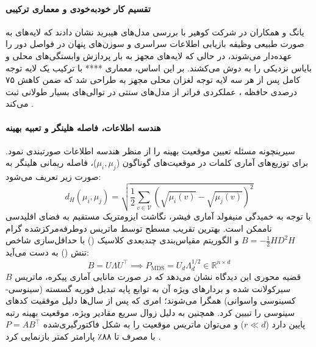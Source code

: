 \paragraph*{تقسیم کار خودبه‌خودی و معماری ترکیبی }
یانگ و همکاران در شرکت کوهیر \cite{yang2025rope} با بررسی مدل‌های هیبرید نشان دادند که لایه‌های  به صورت طبیعی وظیفه بازیابی اطلاعات سراسری و سوزن‌های پنهان در فواصل دور را عهده‌دار می‌شوند، در حالی که لایه‌های مجهز به  بار پردازش وابستگی‌های محلی و بایاس نزدیکی را به دوش می‌کشند. بر این اساس، معماری **** با ترکیب یک لایه توجه کامل  پس از هر سه لایه توجه لغزان محلی مجهز به  طراحی شد که ضمن کاهش ۷۵ درصدی حافظه ، عملکردی فراتر از مدل‌های سنتی در توالی‌های بسیار طولانی ثبت می‌کند \cite{yang2025rope}.

\paragraph*{هندسه اطلاعات، فاصله هلینگر و تعبیه بهینه }
سیرینچونه \cite{cirrincione2026geometry} مسئله تعیین موقعیت بهینه را از منظر هندسه اطلاعات صورتبندی نمود. برای توزیع‌های آماری کلمات در موقعیت‌های گوناگون ($\mu_i, \mu_j$)، فاصله ریمانی هلینگر به صورت زیر تعریف می‌شود:
\begin{equation}
    d_H(\mu_i, \mu_j) = \sqrt{\frac{1}{2} \sum_{v \in \mathcal{V}} \left( \sqrt{\mu_i(v)} - \sqrt{\mu_j(v)} \right)^2}
\end{equation}
با توجه به خمیدگی منیفولد آماری فیشر، نگاشت ایزومتریک مستقیم به فضای اقلیدسی ناممکن است. بهترین تقریب مسطح توسط ماتریس دوطرفه‌مرکزشده گرام $B = -\frac{1}{2} H D^2 H$ و الگوریتم مقیاس‌بندی چندبعدی کلاسیک () با حداقل‌سازی شاخص تنش () به دست می‌آید:
\begin{equation}
    B = U \Lambda U^\top \implies P_{\text{MDS}} = U_d \Lambda_d^{1/2} \in \mathbb{R}^{n \times d}
\end{equation}
قضیه محوری این دیدگاه نشان می‌دهد که در صورت مانایی آماری پیکره، ماتریس $B$ سیرکولانت شده و بردارهای ویژه آن به توابع پایه تبدیل فوریه گسسته (سینوسی-کسینوسی واسوانی) همگرا می‌شوند؛ امری که پس از سال‌ها دلیل موفقیت کدهای سینوسی را تبیین کرد. همچنین به دلیل زوال سریع مقادیر ویژه، موقعیت بهینه رتبه پایین دارد ($r \ll d$) و می‌توان ماتریس موقعیت را به شکل فاکتورگیری‌شده $P = A B^\top$ با مصرف تا ۸۸٪ پارامتر کمتر بازنمایی کرد \cite{cirrincione2026geometry}.

